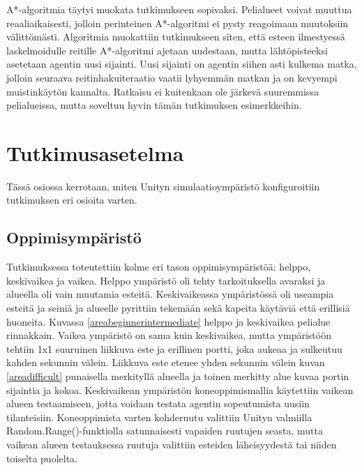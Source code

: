 \documentclass[utf8]{gradu3}
\begin{document}
A*-algoritmia täytyi muokata tutkimukseen sopivaksi. Pelialueet voivat muuttua reaaliaikaisesti, jolloin perinteinen A*-algoritmi ei pysty reagoimaan muutoksiin välittömästi. Algoritmia muokattiin tutkimukseen siten, että esteen ilmestyessä laskelmoidulle reitille A*-algoritmi ajetaan uudestaan, mutta lähtöpisteeksi asetetaan agentin uusi sijainti. Uusi sijainti on agentin siihen asti kulkema matka, jolloin seuraava reitinhakuiteraatio vaatii lyhyemmän matkan ja on kevyempi muistinkäytön kannalta. Ratkaisu ei kuitenkaan ole järkevä suuremmissa pelialueissa, mutta soveltuu hyvin tämän tutkimuksen esimerkkeihin.

\section{Tutkimusasetelma}
\label{sec:tutkimusasetelma}

Tässä osiossa kerrotaan, miten Unityn simulaatioympäristö konfiguroitiin tutkimuksen eri osioita varten.

\subsection{Oppimisympäristö}

Tutkimuksessa toteutettiin kolme eri tason oppimisympäristöä: helppo, keskivaikea ja vaikea. Helppo ympäristö oli tehty tarkoituksella avaraksi ja alueella oli vain muutamia esteitä. Keskivaikeassa ympäristössä oli useampia esteitä ja seiniä ja alueelle pyrittiin tekemään sekä kapeita käytäviä että erillisiä huoneita. Kuvassa \ref{areabeginnerintermediate} helppo ja keskivaikea pelialue rinnakkain. Vaikea ympäristö on sama kuin keskivaikea, mutta ympäristöön tehtiin 1x1 suuruinen liikkuva este ja erillinen portti, joka aukeaa ja sulkeutuu kahden sekunnin välein. Liikkuva este etenee yhden sekunnin välein kuvan \ref{areadifficult} punaisella merkityllä alueella ja toinen merkitty alue kuvaa portin sijaintia ja kokoa. Keskivaikean ympäristön koneoppimismallia käytettiin vaikean alueen testaamiseen, jotta voidaan testata agentin sopeutumista uusiin tilanteisiin. Koneoppimista varten kohderuutu valittiin Unityn valmiilla Random.Range()-funktiolla satunnaisesti vapaiden ruutujen seasta, mutta vaikean alueen testauksessa ruutuja valittiin esteiden läheisyydestä tai niiden toiselta puolelta.
\end{document}
